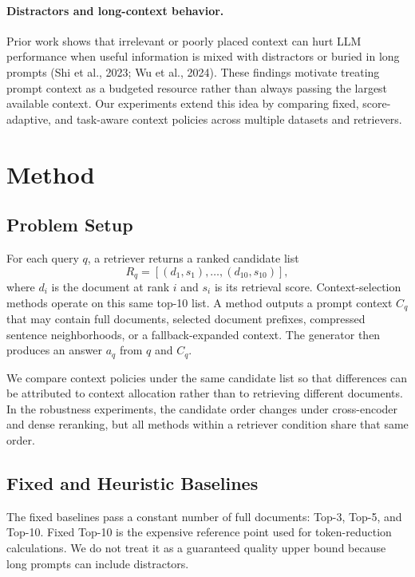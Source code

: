 \documentclass[11pt]{article}
\begin{document}
\paragraph{Distractors and long-context behavior.}
Prior work shows that irrelevant or poorly placed context can hurt LLM performance when useful information is mixed with distractors or buried in long prompts (Shi et al., 2023; Wu et al., 2024). These findings motivate treating prompt context as a budgeted resource rather than always passing the largest available context. Our experiments extend this idea by comparing fixed, score-adaptive, and task-aware context policies across multiple datasets and retrievers.

\section{Method}

\subsection{Problem Setup}

For each query $q$, a retriever returns a ranked candidate list
\[
R_q = [(d_1,s_1), \ldots, (d_{10},s_{10})],
\]
where $d_i$ is the document at rank $i$ and $s_i$ is its retrieval score. Context-selection methods operate on this same top-10 list. A method outputs a prompt context $C_q$ that may contain full documents, selected document prefixes, compressed sentence neighborhoods, or a fallback-expanded context. The generator then produces an answer $a_q$ from $q$ and $C_q$.

We compare context policies under the same candidate list so that differences can be attributed to context allocation rather than to retrieving different documents. In the robustness experiments, the candidate order changes under cross-encoder and dense reranking, but all methods within a retriever condition share that same order.

\subsection{Fixed and Heuristic Baselines}

The fixed baselines pass a constant number of full documents: Top-3, Top-5, and Top-10. Fixed Top-10 is the expensive reference point used for token-reduction calculations. We do not treat it as a guaranteed quality upper bound because long prompts can include distractors.
\end{document}
